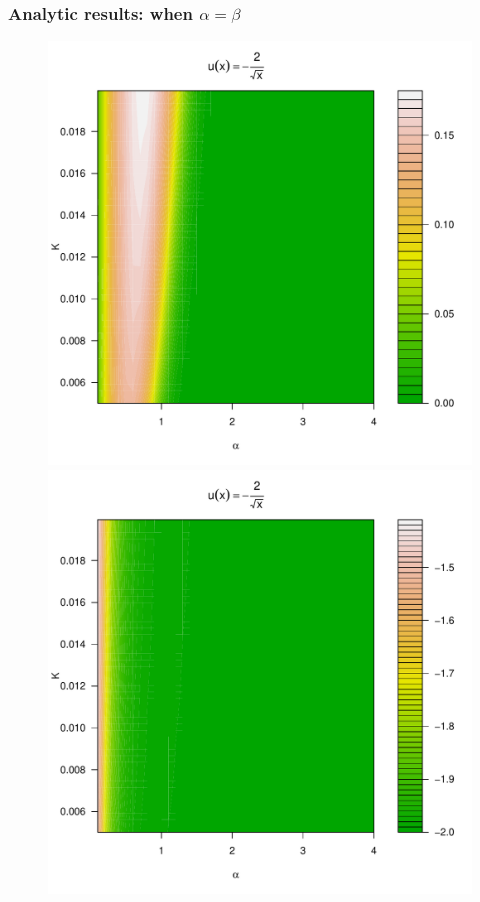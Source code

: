 \documentclass{beamer}
\begin{document}
\begin{frame}
  \frametitle{Analytic results: when $\alpha = \beta$}
  \begin{minipage}[t]{0.4\linewidth}
    \begin{figure}[htb!]
      \begin{minipage}{\linewidth}
        \includegraphics[width=1.0\textwidth, trim={0, 0, 0, 2cm}, clip]{phi_hat_pareto5e-1.pdf}    
      \end{minipage}\hfill
      \begin{minipage}{\linewidth}
        \includegraphics[width=1.0\textwidth, trim={0, 0, 0, 2cm}, clip]{preference_pareto5e-1.pdf}        

\end{minipage}
\end{figure}
\end{minipage}
\end{frame}
\end{document}
